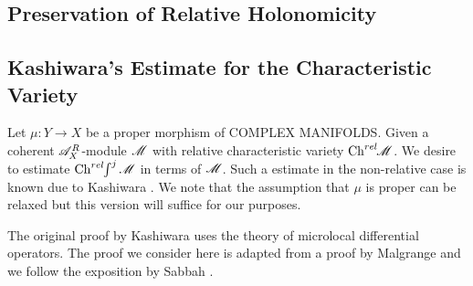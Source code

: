 \subsection{Preservation of Relative Holonomicity}
\subsection{Kashiwara's Estimate for the Characteristic Variety}
Let $\mu:Y\to X$ be a proper morphism of COMPLEX MANIFOLDS. Given a coherent $\mathscr{A}_X^R$-module $\mathscr{M}$ with relative characteristic variety $\operatorname{Ch}^{rel}\mkern-5mu \mathscr{M}$. We desire to estimate $\operatorname{Ch}^{rel}\mkern-5mu \int^j \mathscr{M}$ in terms of $\mathscr{M}$. Such a estimate in the non-relative case is known due to Kashiwara \cite{kashiwara1976b}.  We note that the assumption that $\mu$ is proper can be relaxed but this version will suffice for our purposes.

The original proof by Kashiwara \cite{kashiwara1976b} uses the theory of microlocal differential operators. The proof we consider here is adapted from a proof by Malgrange \cite{malgrange1985images} and we follow the exposition by Sabbah \cite[p36]{sabbah2011introduction}.

